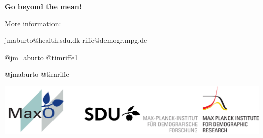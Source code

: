 \documentclass[xcolor={dvipsnames}]{beamer}
\begin{document}

\begin{frame}
 \begin{center}
	\begin{center}
	\Large{
	 \textbf{Go beyond the mean!}}
	\end{center}
	
	\bigskip
	\bigskip
More information: 

jmaburto@health.sdu.dk \quad riffe@demogr.mpg.de

\faTwitter \quad  @jm\_aburto \quad @timriffe1


\faGithub \quad @jmaburto \quad @timriffe

\includegraphics[scale=0.2]{Figures/logos.pdf}    

\end{center}
 
 

\end{frame}
\end{document}
